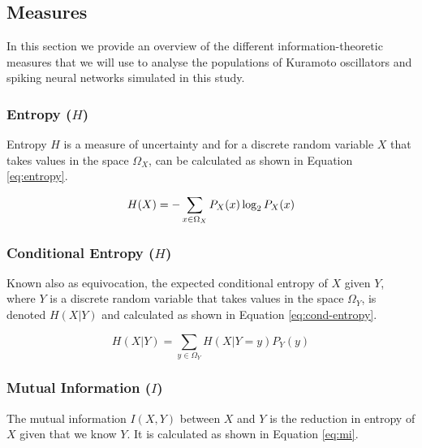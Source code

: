 \documentclass[a4paper,11pt]{article}
\begin{document}
\subsection{Measures}
\label{Measures}
In this section we provide an overview of the different information-theoretic measures that we will use to analyse the populations of Kuramoto oscillators and spiking neural networks simulated in this study.

\subsubsection{Entropy ($H$)}
\label{sec:bg:entropy}

Entropy $H$ is a measure of uncertainty and for a discrete random variable $X$ that takes values in the space $\Omega_X$, can be calculated as shown in Equation \ref{eq:entropy}.

\begin{equation} \label{eq:entropy}
H(X) = - \sum_{x \in \Omega_X}P_X(x) \log_2 P_X(x)\\[2.5mm]
\end{equation}

\subsubsection{Conditional Entropy ($H$)}
\label{sec:bg:cond-entropy}

Known also as equivocation, the expected conditional entropy of $X$ given $Y$, where $Y$ is a discrete random variable that takes values in the space $\Omega_Y$, is denoted $H(X|Y)$ and calculated as shown in Equation \ref{eq:cond-entropy}.

\begin{equation}
\label{eq:cond-entropy}
H(X|Y) = \sum_{y \in \Omega_Y}H(X|Y=y)P_Y(y)
\end{equation}

\subsubsection{Mutual Information ($I$)}
\label{sec:bg:mi}

The mutual information $I(X,Y)$ between $X$ and $Y$ is the reduction in entropy of $X$ given that we know $Y$. It is calculated as shown in Equation \ref{eq:mi}.
\end{document}
